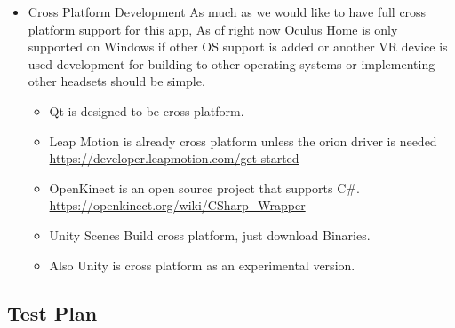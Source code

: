\documentclass[a4paper,10pt]{article}
\begin{document}
\begin{itemize}
\begin{itemize}
  \end{itemize}
  \item Cross Platform Development
  As much as we would like to have full cross platform support for this app, As of right now 
  Oculus Home is only supported on Windows if other OS support 
  is added or another VR device is used development for building to other operating systems or
  implementing other headsets should be simple.
  \begin{itemize}
  \item Qt is designed to be cross platform. 
  \item Leap Motion is already cross platform unless the orion driver is needed
  ~\\\url{https://developer.leapmotion.com/get-started}
    \item OpenKinect is an open source project that supports C\#.
  \url{https://openkinect.org/wiki/CSharp_Wrapper}
  \item Unity Scenes Build cross platform, just download Binaries.\
  \item Also Unity is cross platform as an experimental version.
  \end{itemize}
\end{itemize}
\pagebreak
\subsection{Test Plan}
\end{document}
